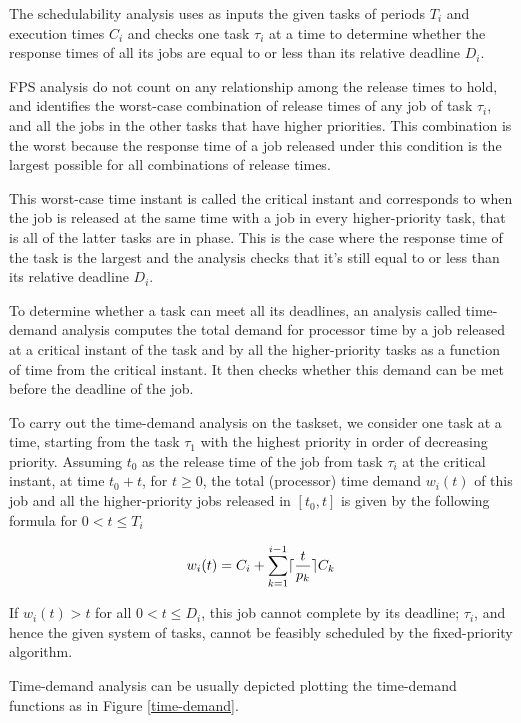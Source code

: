 \documentclass{article}
\begin{document}
The schedulability analysis uses as inputs the given tasks of periods $T_i$ and execution times $C_i$  and checks one task $\tau_i$ at a time to determine whether the response times of all its jobs are equal to or less than its relative deadline $D_i$.

FPS analysis do not count on any relationship among the release times to hold, and identifies the worst-case combination of release times of any job  of task $\tau_i$, and all the jobs in the other tasks that have higher priorities. This combination is the worst because the response time of a job released under this condition is the largest possible for all combinations of release times.

This worst-case time instant is called the critical instant and corresponds to when the job is released at the same time with a job in every higher-priority task, that is all of the latter tasks are in phase. This is the case where the response time of the task is the largest and the analysis checks that it's still equal to or less than its relative deadline $D_i$.

To determine whether a task can meet all its deadlines, an analysis called time-demand analysis computes the total demand for processor time by a job released at a critical instant of the task and by all the higher-priority tasks as a function of time from the critical instant. It then checks whether this demand can be met before the deadline of the job.

To carry out the time-demand analysis on the taskset, we consider one task at a time, starting from the task $\tau_1$ with the highest priority in order of decreasing priority.
Assuming $t_0$ as the release time of the job from task $\tau_i$ at the critical instant, at time $t_0 + t$, for $t \ge 0$, the total (processor) time demand $w_i(t)$ of this job and all the higher-priority jobs released in $[t_0, t]$ is given by the following formula for $0 < t \le T_i$

$$
w_i(t) = C_i + \sum_{k=1}^{i-1} \lceil {t \over p_k} \rceil C_k
$$

If $w_i(t) > t$ for all $0 < t \le D_i$, this job cannot complete by its deadline; $\tau_i$, and hence the given system of tasks, cannot be feasibly scheduled by the fixed-priority algorithm.

Time-demand analysis can be usually depicted plotting the time-demand functions as in Figure \ref{time-demand}.
\end{document}
